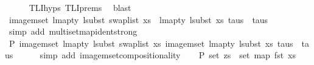 \begin{isabellebody}
\ \ \ \ \isamarkupfalse%
\ TLI{\isachardot}{\kern0pt}hyps\ TLI{\isachardot}{\kern0pt}prems{\isacharparenleft}{\kern0pt}{}{\isacharcomma}{\kern0pt}{}{\isacharparenright}{\kern0pt}\ \isamarkupfalse%
\ blast\isanewline
\isanewline
\ \ \isamarkupfalse%
\ \isamarkupfalse%
\ {\isachardoublequoteopen}image{\isacharunderscore}{\kern0pt}mset\ {\isacharparenleft}{\kern0pt}{\isacharparenleft}{\kern0pt}lmap{\isacharunderscore}{\kern0pt}ty\ {\isacharparenleft}{\kern0pt}lsubst\ {\isacharparenleft}{\kern0pt}swap{\isacharunderscore}{\kern0pt}list\ xs{\isacharparenright}{\kern0pt}{\isacharparenright}{\kern0pt}{\isacharparenright}{\kern0pt}\ {\isasymcirc}\ {\isacharparenleft}{\kern0pt}lmap{\isacharunderscore}{\kern0pt}ty\ {\isacharparenleft}{\kern0pt}lsubst\ xs{\isacharparenright}{\kern0pt}{\isacharparenright}{\kern0pt}{\isacharparenright}{\kern0pt}\ taus\ {\isacharequal}{\kern0pt}\ taus{\isachardoublequoteclose}\isanewline
\ \ \ \ \isamarkupfalse%
\ {\isacharparenleft}{\kern0pt}simp\ add{\isacharcolon}{\kern0pt}\ multiset{\isachardot}{\kern0pt}map{\isacharunderscore}{\kern0pt}ident{\isacharunderscore}{\kern0pt}strong{\isacharparenright}{\kern0pt}\isanewline
\isanewline
\ \ \isamarkupfalse%
\ \isamarkupfalse%
\ P{}{\isacharcolon}{\kern0pt}\ {\isachardoublequoteopen}image{\isacharunderscore}{\kern0pt}mset\ {\isacharparenleft}{\kern0pt}lmap{\isacharunderscore}{\kern0pt}ty\ {\isacharparenleft}{\kern0pt}lsubst\ {\isacharparenleft}{\kern0pt}swap{\isacharunderscore}{\kern0pt}list\ xs{\isacharparenright}{\kern0pt}{\isacharparenright}{\kern0pt}{\isacharparenright}{\kern0pt}\ {\isacharparenleft}{\kern0pt}image{\isacharunderscore}{\kern0pt}mset\ {\isacharparenleft}{\kern0pt}lmap{\isacharunderscore}{\kern0pt}ty\ {\isacharparenleft}{\kern0pt}lsubst\ xs{\isacharparenright}{\kern0pt}{\isacharparenright}{\kern0pt}\ taus{\isacharparenright}{\kern0pt}\ {\isacharequal}{\kern0pt}\ taus{\isachardoublequoteclose}\isanewline
\ \ \ \ \isamarkupfalse%
\ {\isacharparenleft}{\kern0pt}simp\ add{\isacharcolon}{\kern0pt}\ image{\isacharunderscore}{\kern0pt}mset{\isachardot}{\kern0pt}compositionality{\isacharparenright}{\kern0pt}\isanewline
\isanewline
\ \ \isamarkupfalse%
\ P{}{\isacharcolon}{\kern0pt}\ {\isachardoublequoteopen}set\ zs\ {\isasymsubseteq}\ set\ {\isacharparenleft}{\kern0pt}map\ fst\ xs{\isacharparenright}{\kern0pt}{\isachardoublequoteclose}\isanewline
\ \ \ \ \isamarkupfalse%

\end{isabellebody}
